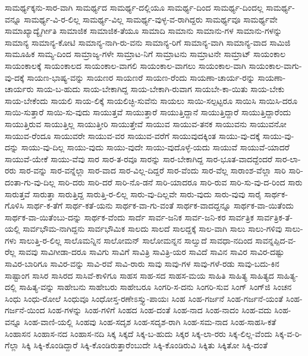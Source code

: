 ಸಾಮರ್ಥ್ಯಕ್ಕನು-ಸಾರ-ವಾಗಿ
ಸಾಮರ್ಥ್ಯದ
ಸಾಮರ್ಥ್ಯ-ದಲ್ಲಿಯೂ
ಸಾಮರ್ಥ್ಯ-ದಿಂದ
ಸಾಮರ್ಥ್ಯ-ದಿಂದಲ್ಲ
ಸಾಮರ್ಥ್ಯ-ವನ್ನೂ
ಸಾಮರ್ಥ್ಯ-ವಿ-ರ-ಲಿಲ್ಲ
ಸಾಮರ್ಥ್ಯ-ವಿಲ್ಲ
ಸಾಮರ್ಥ್ಯ-ವುಳ್ಳ-ವ-ರಾಗಿದ್ದರು
ಸಾಮರ್ಥ್ಯವೂ
ಸಾಮರ್ಥ್ಯವೇ
ಸಾಮಾಖ್ಯಾದ್ಯೈರ್ಗೀತಿ
ಸಾಮಾಜಿಕ
ಸಾಮಾಜಿಕ-ತೆಯೂ
ಸಾಮಾದಿ
ಸಾಮಾನು
ಸಾಮಾನು-ಗಳ
ಸಾಮಾನು-ಗಳನ್ನು
ಸಾಮಾನ್ಯ
ಸಾಮಾನ್ಯ-ಕೋಟಿ
ಸಾಮಾನ್ಯ-ನಾಗಿ-ರು-ವನು
ಸಾಮಾನ್ಯ-ರಿಗೆ
ಸಾಮಾನ್ಯ-ವಾಗಿ
ಸಾಮಾನ್ಯ-ವಾದ
ಸಾಮಿಜಿ
ಸಾಮೂಹಿಕ
ಸಾಮ್ಯ-ದಿಂದ
ಸಾಮ್ರಾಜ್ಯ-ಗಳೇ
ಸಾಮ್ರಾಟ-ನಿಗೆ
ಸಾಮ್ರಾಟನು
ಸಾಮ್ರಾಟನೇ
ಸಾಮ್ರಾಟ್
ಸಾಯಂಕಾಲ
ಸಾಯಂಕಾಲಕ್ಕೆ
ಸಾಯಂಕಾಲದ
ಸಾಯಂಕಾಲ-ವಾಗಲಿ
ಸಾಯಂಕಾಲ-ವಾಗಲು
ಸಾಯಂಕಾಲ-ವಾಗಿ
ಸಾಯಂಕಾಲ-ವಾಗು-ವು-ದಕ್ಕೆ
ಸಾಯಣ-ಭಾಷ್ಯ-ವನ್ನು
ಸಾಯಣರ
ಸಾಯಣರೆ
ಸಾಯಣ-ರೆಂದು
ಸಾಯಣಾ-ಚಾರ್ಯ-ರನ್ನು
ಸಾಯಣಾ-ಚಾರ್ಯರು
ಸಾಯ-ಬ-ಹುದು
ಸಾಯ-ಬೇಕಾಗಿದ್ದ
ಸಾಯ-ಬೇಕಾಗಿ-ರುವಾಗ
ಸಾಯಬೇ-ಕಾ-ಯಿತು
ಸಾಯ-ಬೇಕು
ಸಾಯ-ಬೇಕೆಂದು
ಸಾಯಲಿ
ಸಾಯ-ಲಿಕ್ಕೆ
ಸಾಯಲಿಚ್ಛಿ-ಸುವೆನು
ಸಾಯಲು
ಸಾಯಿ-ಸಲ್ಪಟ್ಟರೂ
ಸಾಯಿಸಿ
ಸಾಯಿಸಿ-ದರೂ
ಸಾಯಿ-ಸುತ್ತಾರೆ
ಸಾಯಿ-ಸು-ವುದು
ಸಾಯುತ್ತವೆ
ಸಾಯುತ್ತಾರೆ
ಸಾಯುತ್ತಿದ್ದಾನೆ
ಸಾಯುತ್ತಿದ್ದಾರೆ
ಸಾಯುತ್ತಿದ್ದಾರೆಂದು
ಸಾಯುತ್ತಿರುವ
ಸಾಯುತ್ತಿಲ್ಲ
ಸಾಯುತ್ತೀರಿ
ಸಾಯುತ್ತೇವೆ
ಸಾಯುವ
ಸಾಯುವ-ತನಕ
ಸಾಯುವನು
ಸಾಯುವನೋ
ಸಾಯುವ-ರೆಂದೂ
ಸಾಯುವರೇ
ಸಾಯುವ-ವರ
ಸಾಯುವ-ವರೆಗೆ
ಸಾಯುವುದಕ್ಕಿಂತ
ಸಾಯು-ವು-ದಕ್ಕೆ
ಸಾಯು-ವು-ದನ್ನು
ಸಾಯು-ವು-ದಿಲ್ಲ
ಸಾಯು-ವುದು
ಸಾಯು-ವುದೇ
ಸಾಯು-ವುದೊಳ್ಳೆ-ಯದು
ಸಾಯುವೆ
ಸಾಯುವೆ-ಯಾದರೆ
ಸಾಯುವೆ-ಯೇಕೆ
ಸಾಯು-ವೆವು
ಸಾರ
ಸಾರ-ತ-ರವೂ
ಸಾರನ್ನು
ಸಾರ-ಬೇಕಾಗಿದ್ದ
ಸಾರ-ಭೂತ-ವಾದದ್ದೆಂದರೆ
ಸಾರ-ಲಾ-ರರು
ಸಾರ-ವನ್ನು
ಸಾರ-ವನ್ನೆಲ್ಲಾ
ಸಾರ-ವಾದ
ಸಾರ-ವಿಲ್ಲ-ದಿದ್ದರೆ
ಸಾರ-ವೆಂದು
ಸಾರ-ವೆಲ್ಲ
ಸಾರಾಂಶ-ವೆಲ್ಲಾ
ಸಾರಿ
ಸಾರಿ-ದಂತಾ-ಗು-ವು-ದಿಲ್ಲ
ಸಾರಿ-ದರು
ಸಾರಿ-ದರೆ
ಸಾರಿ-ನೊ-ಡನೆ
ಸಾರಿ-ಯಾದರೂ
ಸಾರಿ-ರುವ
ಸಾರಿ-ಸು-ವು-ದ-ರಿಂದ
ಸಾರು
ಸಾರುತ್ತವೆ
ಸಾರುತ್ತಾ
ಸಾರುತ್ತಿದ್ದ
ಸಾರುತ್ತಿ-ರ-ಲಿಲ್ಲ
ಸಾರು-ವು-ದಿಲ್ಲವೇ
ಸಾರು-ವುದು
ಸಾರು-ವುವು
ಸಾರೈ
ಸಾರ್ಥಕ-ಗೊಳಿಸಿ
ಸಾರ್ಥ-ಕ-ತೆಗೆ
ಸಾರ್ಥ-ಕತೆ-ಯನು
ಸಾರ್ಥಕ-ವಾ-ಗು-ವಂತೆ
ಸಾರ್ಥಕ-ವಾದದ್ದನ್ನೂ
ಸಾರ್ಥಕ-ವಾ-ಯಿತೆಂದು
ಸಾರ್ಥಕ-ವಾ-ಯಿತೆಂಬು-ದನ್ನು
ಸಾರ್ಥಕ-ವೆಂದು
ಸಾರ್ದೆ
ಸಾರ್ವ-ಜನಿಕ
ಸಾರ್ವ-ಜನಿ-ಕರ
ಸಾರ್ವತ್ರಿಕ
ಸಾರ್ವತ್ರಿಕ-ತೆ-ಯಲ್ಲಿ
ಸಾರ್ವಭೌಮ-ನಾಗಿದ್ದನು
ಸಾರ್ವಭೌಮಿಕ
ಸಾಲದು
ಸಾಲದೆ
ಸಾಲದ್ದಕ್ಕೆ
ಸಾಲ-ವಾಗಿ
ಸಾಲು
ಸಾಲು-ಗಳಿವು
ಸಾಲು-ಗಳು
ಸಾಲುತ್ತಿ-ರ-ಲಿಲ್ಲ
ಸಾಲೊಮನ್ನಿನ
ಸಾಲೋಮನ್
ಸಾಲೋಮನ್ನನ
ಸಾಲ್ವುದೆ
ಸಾವಧಾ-ನದಿಂದ
ಸಾವನ್ನಪ್ಪಿದ-ವ-ರೆಲ್ಲ
ಸಾವವು
ಸಾವಿಗೀಡಾ-ದರೂ
ಸಾವಿಗು
ಸಾವಿಗೆ
ಸಾವಿತ್ರಿ
ಸಾವಿತ್ರಿ-ಯರ
ಸಾವಿದೆ
ಸಾವಿನ
ಸಾವಿರ
ಸಾವಿರ-ದಷ್ಟು
ಸಾವಿರ-ಬಾರಿಗೂ
ಸಾವಿರ-ವನ್ನು
ಸಾವಿ-ರವೆ
ಸಾವಿ-ರಾರು
ಸಾವು
ಸಾವು-ಗಳ
ಸಾವು-ಗಳೆ-ರಡು
ಸಾವು-ಬದು-ಕಿನ
ಸಾಷ್ಟಾಂಗ
ಸಾಸಿರ
ಸಾಸಿರದ
ಸಾಸಿವೆ-ಕಾಳಿಗೂ
ಸಾಹಸ
ಸಾಹ-ಸದ
ಸಾಹಸ-ಮಯ
ಸಾಹಿತಿ
ಸಾಹಿತ್ಯ
ಸಾಹಿತ್ಯದ
ಸಾಹಿತ್ಯ-ದಲ್ಲಿ
ಸಾಹಿತ್ಯ-ವನ್ನು
ಸಾಹೇಬನು
ಸಾಹೇಬರು
ಸಾಹೇಬರೂ
ಸಿಂಗರಿ-ಸ-ದನು
ಸಿಂಗರಿ-ಸುವ
ಸಿಂಗ್
ಸಿಂಗ್‌ಜಿ
ಸಿಂಚನ
ಸಿಂಧು
ಸಿಂಧು-ರೋಲೆ
ಸಿಂಧುವೂ
ಸಿಂಧೋಸ್ತ-ರಣೇಽಸ್ತ್ಯು-ಪಾಯಃ
ಸಿಂಹ
ಸಿಂಹ-ಗರ್ಜನೆ
ಸಿಂಹ-ಗರ್ಜನೆ-ಯಂತೆ
ಸಿಂಹ-ಗರ್ಜನೆ-ಯಿಂದ
ಸಿಂಹ-ಗಳನ್ನು
ಸಿಂಹ-ಗಳಿಗೆ
ಸಿಂಹದ
ಸಿಂಹ-ದಂತೆ
ಸಿಂಹ-ನಾದ
ಸಿಂಹ-ನಾದಂ
ಸಿಂಹ-ವದು
ಸಿಂಹ-ವನ್ನೂ
ಸಿಂಹ-ವಾಣಿ-ಯಲ್ಲಿ
ಸಿಂಹವು
ಸಿಂಹ-ಸದೃಶ
ಸಿಂಹ-ಸದೃಶ-ರಾಗಿ
ಸಿಂಹ-ಸಮ-ನಾದ
ಸಿಂಹ-ಸಾಹಸಿ-ಕತೆ
ಸಿಂಹಾಸನ
ಸಿಂಹಾಸ-ನದ
ಸಿಂಹಾಸ-ನದಿ
ಸಿಕ್ಕ
ಸಿಕ್ಕದೆ
ಸಿಕ್ಕ-ಬ-ಹುದು
ಸಿಕ್ಕರ
ಸಿಕ್ಕ-ಲಾ-ರರು
ಸಿಕ್ಕ-ಲಿಲ್ಲ-ವೆಂದು
ಸಿಕ್ಕ-ವ-ರಿ-ಗೆಲ್ಲಾ
ಸಿಕ್ಕಿ
ಸಿಕ್ಕಿ-ಕೊಂಡಿದ್ದಾರೆ
ಸಿಕ್ಕಿ-ಕೊಂಡಿರುತ್ತಾರೆಂಬುದೇ
ಸಿಕ್ಕಿ-ಕೊಂಡಿರುವಿ
ಸಿಕ್ಕಿತು
ಸಿಕ್ಕಿತೋ
ಸಿಕ್ಕಿ-ದಂತೆ
